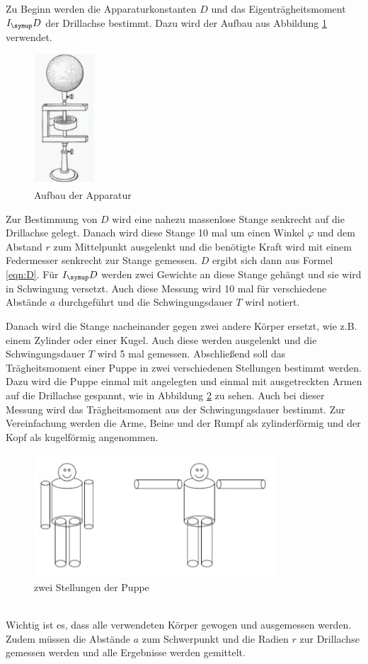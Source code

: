 Zu Beginn werden die Apparaturkonstanten $D$ und das Eigenträgheitsmoment $I_\su{D}$
der Drillachse bestimmt.
Dazu wird der Aufbau aus Abbildung \ref{fig:aufbau} verwendet.
\begin{figure}
  \centering
  \includegraphics[width=0.2\textwidth]{bilder/aufbau.jpg}
  \caption{Aufbau der Apparatur}
  \label{fig:aufbau}
\end{figure}
Zur Bestimmung von $D$ wird eine nahezu massenlose Stange senkrecht auf die Drillachse gelegt.
Danach wird diese Stange 10 mal um einen Winkel $\varphi$ und dem Abstand $r$
zum Mittelpunkt ausgelenkt und die benötigte Kraft wird mit einem Federmesser
senkrecht zur Stange gemessen. $D$ ergibt sich dann aus Formel \eqref{eqn:D}.
Für $I_\su{D}$ werden zwei Gewichte an diese Stange gehängt und sie wird in Schwingung
versetzt. Auch diese Messung wird 10 mal für verschiedene Abstände $a$ durchgeführt
und die Schwingungsdauer $T$ wird notiert.

Danach wird die Stange nacheinander gegen zwei andere Körper ersetzt, wie z.B.
einem Zylinder oder einer Kugel. Auch diese werden ausgelenkt und die Schwingungsdauer
$T$ wird 5 mal gemessen.
\newpage
Abschließend soll das Trägheitsmoment einer Puppe in zwei verschiedenen Stellungen
bestimmt werden. Dazu wird die Puppe einmal mit angelegten und einmal mit ausgetreckten
Armen auf die Drillachse gespannt, wie in Abbildung \ref{fig:puppe} zu sehen.
Auch bei dieser Messung wird das Trägheitsmoment aus
der Schwingungsdauer bestimmt. Zur Vereinfachung werden die Arme, Beine und der Rumpf
als zylinderförmig und der Kopf als kugelförmig angenommen.
\begin{figure}[!h]
  \centering
  \includegraphics[width=0.8\textwidth]{bilder/puppe.jpg}
  \caption{zwei Stellungen der Puppe}
  \label{fig:puppe}
\end{figure} \\
Wichtig ist es, dass alle verwendeten Körper gewogen und ausgemessen werden.
Zudem müssen die Abstände $a$ zum Schwerpunkt und die Radien $r$ zur Drillachse gemessen
werden und alle Ergebnisse werden gemittelt.
